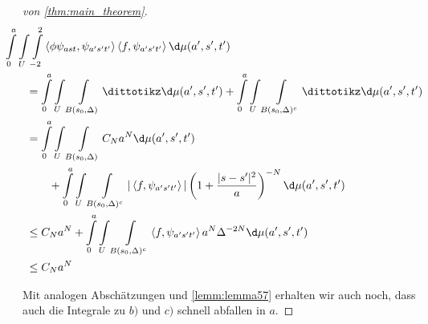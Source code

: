 \begin{proof}[von \ref{thm:main_theorem}]
\begin{align*}
&\kern -2em
 \int\limits_{0}^{a} \int\limits_{U} \int\limits_{-2}^2
 \left\langle \phi \psi_{ast}, \psi_{a's't'} \right\rangle
 \left\langle f, \psi_{a's't'} \right\rangle
    \d \mu(a',s',t')
\\&=
 \int\limits_{0}^{a} \int\limits_{U} \int\limits_{B(s_0,\Delta)}
 \dittotikz
    \d \mu(a',s',t')
    +
 \int\limits_{0}^{a} \int\limits_{U} \int\limits_{B(s_0,\Delta)^c}
 \dittotikz
    \d \mu(a',s',t')
\\&=
 \int\limits_{0}^{a} \int\limits_{U} \int\limits_{B(s_0,\Delta)} C_N a^N
 \d \mu(a',s',t')
 \\&\kern +2em+
 \int\limits_{0}^{a} \int\limits_{U} \int\limits_{B(s_0,\Delta)^c}
 |\left\langle f, \psi_{a's't'} \right\rangle|
 \left(1+\frac{|s-s'|^2}{a}\right)^{-N}
 \d \mu(a',s',t')
 \\ &\leq
 C_N a^N +
  \int\limits_{0}^{a} \int\limits_{U} \int\limits_{B(s_0,\Delta)^c}
 \left\langle f, \psi_{a's't'} \right\rangle
 a^N \Delta^{-2N}
 \d \mu(a',s',t')
 \\&\leq
 C_N a^N
\end{align*}

Mit analogen Abschätzungen und \cref{lemm:lemma57} erhalten wir auch noch, dass auch die Integrale zu $b)$ und $c)$ schnell abfallen in $a$.

\end{proof}




